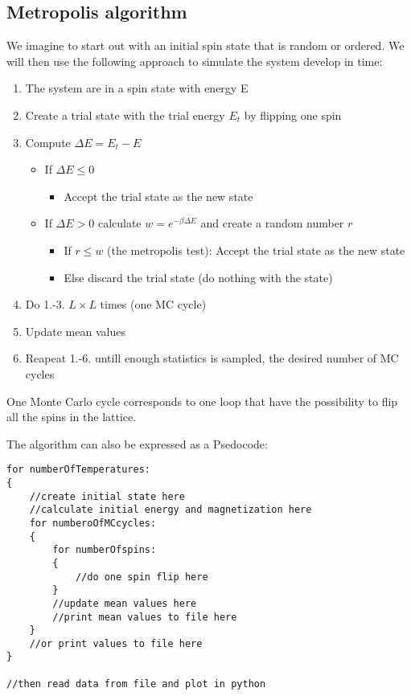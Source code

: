 \documentclass[11pt,a4wide]{article}
\begin{document}
\subsection{Metropolis algorithm}
We imagine to start out with an initial spin state that is random or ordered. We will then use the following approach to simulate the system develop in time:
\begin{enumerate}
\item The system are in a spin state with energy E
\item Create a trial state with the trial energy $E_t$ by flipping one spin
\item Compute $\Delta E = E_t - E$
\begin{itemize}
\item If $\Delta E \leq 0$
\begin{itemize}
\item Accept the trial state as the new state 
\end{itemize}
\item If $\Delta E >0$ calculate $w = e^{-\beta \Delta E}$ and create a random number $r$
\begin{itemize}
\item If $r\leq w$ (the metropolis test): Accept the trial state as the new state 
\item Else discard the trial state (do nothing with the state)
\end{itemize}
\end{itemize}
\item Do 1.-3. $L\times L$ times (one MC cycle)
\item Update mean values 
\item Reapeat 1.-6. untill enough statistics is sampled, the desired number of MC cycles
\end{enumerate}

One Monte Carlo cycle corresponds to one loop that have the possibility to flip all the spins in the lattice. 

The algorithm can also be expressed as a Psedocode:
\begin{lstlisting}
for numberOfTemperatures:
{
	//create initial state here
	//calculate initial energy and magnetization here
	for numberoOfMCcycles:
	{
		for numberOfspins:
		{
			//do one spin flip here
		}
		//update mean values here
		//print mean values to file here
	}	
	//or print values to file here
}

//then read data from file and plot in python
\end{lstlisting}
\end{document}
